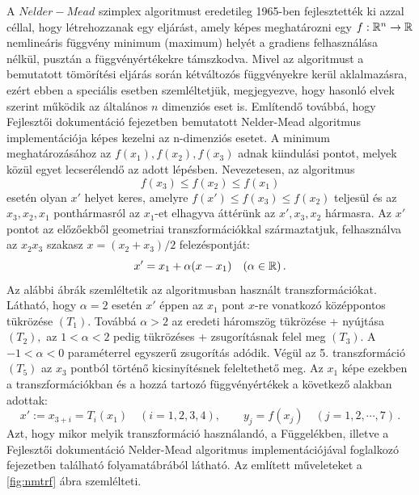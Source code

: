 \documentclass[oneside,titlepage,12pt,a4paper]{report}
\begin{document}
A $Nelder-Mead$ szimplex algoritmust \cite{nelderMead} eredetileg 1965-ben
fejlesztették ki azzal céllal, hogy létrehozzanak egy eljárást, amely
képes meghatározni egy $f : \Bbb R^n \to \Bbb R$ nemlineáris függvény minimum (maximum) helyét a  gradiens felhasználása  nélkül,
 pusztán a függvényértékekre  támszkodva. 
Mivel az algoritmust a bemutatott tömörítési eljárás során kétváltozós függvényekre kerül aklalmazásra, ezért ebben a speciális esetben szemléltetjük, megjegyezve, hogy hasonló 
elvek szerint
 működik az általános $n$ dimenziós eset is. Említendő továbbá, hogy Fejlesztői dokumentáció fejezetben bemutatott Nelder-Mead algoritmus implementációja képes kezelni az n-dimenziós esetet.  A minimum meghatározásához az $f(x_1), f(x_2), f(x_3)$  adnak kiindulási pontot, melyek közül egyet lecserélendő az adott lépésben. Nevezetesen, az algoritmus
\begin{equation*}
f(x_3)\le f(x_2)\le f(x_1)
\end{equation*}
 esetén olyan $x'$ helyet keres, amelyre $f(x')\le  f(x_3)\le f(x_2)$ teljesül és az $x_3, x_2, x_1$ ponthármasról az $x_1$-et elhagyva áttérünk az $x',x_3, x_2$ hármasra. Az $x'$ pontot az előzőekből geometriai transzformációkkal származtatjuk, felhasználva az  $x_2x_3$ szakasz $x=(x_2+x_3)/2$ felezéspontját: 
\begin{equation*}
x'=x_1+\alpha (x-x_1) \quad (\alpha\in\Bbb R)\,.
\end{equation*}
 Az alábbi ábrák szemléltetik az algoritmusban  használt transzformációkat. Látható, hogy $\alpha=2$ esetén $x'$ éppen az $x_1$ pont $x$-re vonatkozó középpontos tükrözése $(T_1).$ Továbbá $\alpha>2$ az eredeti háromszög tükrözése + nyújtása $(T_2),$ az $1<\alpha<2$ pedig tükrözéses + zsugorításnak felel meg $(T_3).$ A $-1<\alpha<0$ paraméterrel egyszerű zsugorítás adódik. Végül az 5. transzformáció $(T_5)$ az $x_3$ pontból történő
 kicsinyítésnek feleltethető meg. Az $x_1$ képe ezekben a transzformációkban és a hozzá tartozó függvényértékek a következő alakban adottak:
\begin{equation*}
x':=x_{3+i}=T_i(x_1)\quad (i=1,2,3,4), \qquad y_j=f(x_j)\quad (j=1,2,\cdots,7)\,.
\end{equation*}
Azt, hogy mikor melyik transzformáció használandó, a Függelékben, illetve a Fejlesztői dokumentáció Nelder-Mead algoritmus implementációjával foglalkozó fejezetben
található  folyamatábrából látható. Az említett műveleteket a \ref{fig:nmtrf} ábra szemlélteti.
\end{document}

